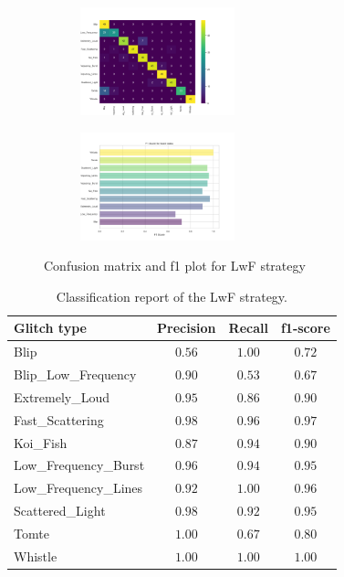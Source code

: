 \begin{figure}[ht]
\centering
\begin{subfigure}
  \centering
  \includegraphics[width=0.49\textwidth]{Images/cm_LwF_MultiView_100epochs.png}  
  \label{fig:sub-first}
\end{subfigure}
\begin{subfigure}
  \centering
  \includegraphics[width=0.49\textwidth]{Images/f1_LwF_MultiView_100epochs.png}  
  \label{fig:sub-second}
\end{subfigure}
\caption{Confusion matrix and f1 plot for LwF strategy}
\label{fig:cm_f1_lwf_baseline}
\end{figure}

\begin{table}
\centering
    \begin{tabular}{|l|c c c|}
    \hline
    \textbf{Glitch type} & \textbf{Precision} & \textbf{Recall} & \textbf{f1-score} \\ \hline
    Blip & $0.56$ & $1.00$ & $0.72$ \\
    Blip\_Low\_Frequency & $0.90$ & $0.53$ & $0.67$\\
    Extremely\_Loud & $0.95$ & $0.86$ &  $0.90$\\
    Fast\_Scattering & $0.98$ & $0.96$ &  $0.97$\\
    Koi\_Fish & $0.87$ & $0.94$ & $0.90$\\
    Low\_Frequency\_Burst & $0.96$ & $0.94$ & $0.95$\\
    Low\_Frequency\_Lines & $0.92$ & $1.00$ & $0.96$\\
    Scattered\_Light & $0.98$ & $0.92$ &$0.95$ \\
    Tomte & $1.00$ & $0.67$ &$0.80$ \\
    Whistle & $1.00$ & $1.00$ & $1.00$ \\
    \hline
    \end{tabular}
    \caption{Classification report of the LwF strategy.}
    \label{tbl:RQ1_class_report_LWF}
\end{table}


